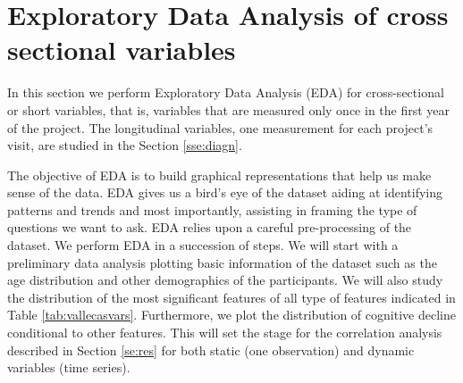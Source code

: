 \documentclass[11pt]{article}
\theoremstyle{definition}
\theoremstyle{remark}
\begin{document}

\section{Exploratory Data Analysis of cross sectional variables}
\label{sse:eda}
In this section we perform Exploratory Data Analysis (EDA) for cross-sectional or short variables, that is, variables that are measured only once in the first year of the project. The longitudinal variables, one measurement for each project's visit, are studied in the Section \ref{sse:diagn}.

The objective of EDA is to build graphical representations that help us make sense of the data. EDA gives us a bird's eye of the dataset aiding at identifying patterns and trends and most importantly, assisting in framing the type of questions we want to ask.
EDA relies upon a careful pre-processing of the dataset. We perform EDA in a succession of steps. We will start with a preliminary data analysis plotting basic information of the dataset such as the age distribution and other demographics of the participants. 
We will also study the distribution of the most significant features of all type of features indicated in Table \ref{tab:vallecasvars}. Furthermore, we plot the distribution of cognitive decline conditional to other features. This will set the stage for the correlation analysis described in Section \ref{se:res} for both static (one observation) and dynamic variables (time series).
\end{document}
